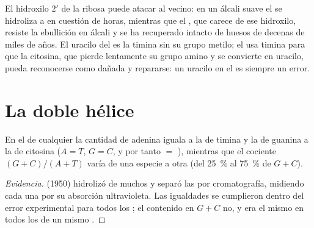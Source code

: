 \begin{example}\label{ex:b1:nucleic-acids:fragile}
El hidroxilo $2'$ de la ribosa puede atacar al  vecino:
en un álcali suave el  se hidroliza a  en cuestión de horas,
mientras que el , que carece de ese hidroxilo, resiste la ebullición en
álcali y se ha recuperado intacto de huesos de decenas de miles de años. El
uracilo del  es la timina sin su grupo metilo; el  usa timina para que
la citosina, que pierde lentamente su grupo amino y se convierte en uracilo,
pueda reconocerse como dañada y repararse: un uracilo en el  es siempre
un error.
\end{example}

\section{La doble hélice}

\begin{proposition}\label{prop:b1:nucleic-acids:chargaff}
En el  de cualquier  la cantidad de adenina iguala a la de
timina y la de guanina a la de citosina ($A = T$, $G = C$, y por tanto
 $=$ ), mientras que el cociente $(G + C)/(A + T)$ varía
de una especie a otra (del \qty{25}{\%} al \qty{75}{\%} de $G + C$).
\end{proposition}
\begin{proof}[Evidencia]
 (1950) hidrolizó  de muchos  y separó las  por
cromatografía, midiendo cada una por su absorción ultravioleta. Las
igualdades se cumplieron dentro del error experimental para todos los ;
el contenido en $G + C$ no, y era el mismo en todos los  de un mismo
.
\end{proof}

